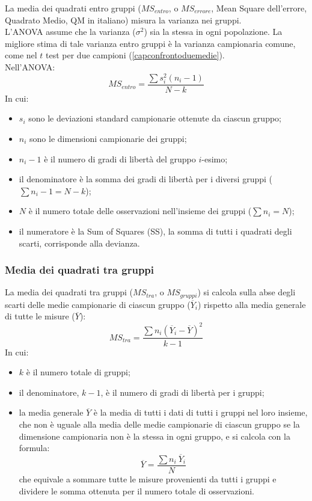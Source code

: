 \documentclass[10pt, draft]{book}
\newcommand{\tightlist}{%
\setlength{\itemsep}{1pt}\setlength{\parskip}{0pt}\setlength{\parsep}{0pt}}
\begin{document}
La media dei quadrati entro gruppi ($MS_{entro}$, o $MS_{errore}$, Mean Square dell'errore, Quadrato Medio, QM in italiano) misura la varianza nei gruppi.\\
L'ANOVA assume che la varianza ($\sigma^2$) sia la stessa in ogni popolazione. La migliore stima di tale varianza entro gruppi è la varianza campionaria comune, come nel $t$ test per due campioni (\ref{capconfrontoduemedie}).\\
Nell'ANOVA:
\begin{equation}
    MS_{entro} = \frac{\sum{s_i^2(n_i-1)}}{N-k}
\end{equation}
In cui:
\begin{itemize}\tightlist
    \item $s_i$ sono le deviazioni standard campionarie ottenute da ciascun gruppo;
    \item $n_i$ sono le dimensioni campionarie dei gruppi;
    \item $n_i - 1$ è il numero di gradi di libertà del gruppo $i$-esimo;
    \item il denominatore è la somma dei gradi di libertà per i diversi gruppi ($\sum{n_i - 1} = N-k$);
    \item $N$ è il numero totale delle osservazioni nell'insieme dei gruppi ($\sum{n_i = N}$);
    \item il numeratore è la Sum of Squares (SS), la somma di tutti i quadrati degli scarti, corrisponde alla devianza.
\end{itemize}

\subsubsection{Media dei quadrati tra gruppi}

La media dei quadrati tra gruppi ($MS_{tra}$, o $MS_{gruppi}$) si calcola sulla abse degli scarti delle medie campionarie di ciascun gruppo ($\overline{Y}_i$) rispetto alla media generale di tutte le misure ($\overline{Y}$):
\begin{equation}
    MS_{tra} = \frac{\sum{n_i(\overline{Y}_i-\overline{Y})^2}}{k-1}
\end{equation}
In cui:
\begin{itemize}\tightlist
    \item $k$ è il numero totale di gruppi;
    \item il denominatore, $k-1$, è il numero di gradi di libertà per i gruppi;
    \item la media generale $\overline{Y}$ è la media di tutti i dati di tutti i gruppi nel loro insieme, che non è uguale alla media delle medie campionarie di ciascun gruppo se la dimensione campionaria non è la stessa in ogni gruppo, e si calcola con la formula:
    \begin{equation}
        \overline{Y} = \frac{\sum{n_i\ \overline{Y}_i}}{N}
    \end{equation}
    che equivale a sommare tutte le misure provenienti da tutti i gruppi e dividere le somma ottenuta per il numero totale di osservazioni.
\end{itemize}
\end{document}
